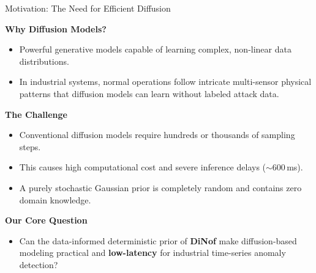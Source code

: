 \documentclass[aspectratio=169, 11pt]{beamer}
\begin{document}
\begin{frame}{Motivation: The Need for Efficient Diffusion}
  
  \textbf{\large Why Diffusion Models?}
  \begin{itemize}\itemsep=4pt
    \item Powerful generative models capable of learning complex, non-linear data distributions.
    \item In industrial systems, normal operations follow intricate multi-sensor physical patterns that diffusion models can learn without labeled attack data.
  \end{itemize}

  \vspace{8pt}
  \textbf{\large The Challenge}
  \begin{itemize}\itemsep=4pt
    \item Conventional diffusion models require hundreds or thousands of sampling steps.
    \item This causes high computational cost and severe inference delays ($\sim$600\,ms).
    \item A purely stochastic Gaussian prior is completely random and contains zero domain knowledge.
  \end{itemize}

  \vspace{8pt}
  \textbf{\large Our Core Question}
  \begin{itemize}\itemsep=4pt
    \item Can the data-informed deterministic prior of \textbf{DiNof} make diffusion-based modeling practical and \textbf{low-latency} for industrial time-series anomaly detection?
  \end{itemize}

\end{frame}
\end{document}
